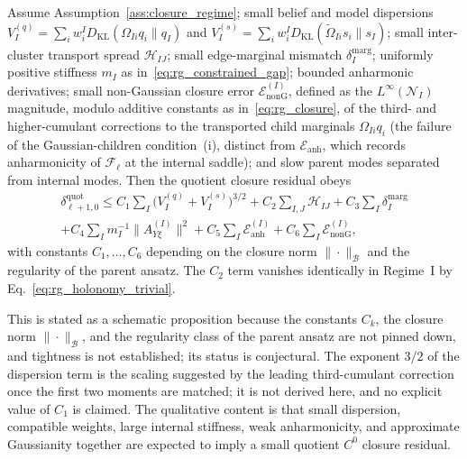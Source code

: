 \begin{proposition}
\label{thm:rg_residual}
Assume Assumption~\ref{ass:closure_regime}; small belief and model dispersions $V_I^{(q)} = \sum_i w_i^I D_{\mathrm{KL}}(\Omega_{Ii}q_i \| q_I)$ and $V_I^{(s)} = \sum_i w_i^I D_{\mathrm{KL}}(\widetilde{\Omega}_{Ii}s_i \| s_I)$; small inter-cluster transport spread $\mathcal{H}_{IJ}$; small edge-marginal mismatch $\delta_I^{\mathrm{marg}}$; uniformly positive stiffness $m_I$ as in~\eqref{eq:rg_constrained_gap}; bounded anharmonic derivatives; small non-Gaussian closure error $\mathcal{E}_{\mathrm{nonG}}^{(I)}$, defined as the $L^\infty(\mathcal{N}_I)$ magnitude, modulo additive constants as in~\eqref{eq:rg_closure}, of the third- and higher-cumulant corrections to the transported child marginals $\Omega_{Ii}q_i$ (the failure of the Gaussian-children condition~(i), distinct from $\mathcal{E}_{\mathrm{anh}}$, which records anharmonicity of $\mathcal{F}_\ell$ at the internal saddle); and slow parent modes separated from internal modes. Then the quotient closure residual obeys
\begin{multline}
\delta_{\ell+1,0}^{\mathrm{quot}} \le C_1\sum_I \big(V_I^{(q)} + V_I^{(s)}\big)^{3/2} + C_2\sum_{I,J}\mathcal{H}_{IJ} + C_3\sum_I \delta_I^{\mathrm{marg}} \\
 + C_4\sum_I m_I^{-1}\|A_{Y\xi}^{(I)}\|^2 + C_5\sum_I \mathcal{E}_{\mathrm{anh}}^{(I)} + C_6\sum_I \mathcal{E}_{\mathrm{nonG}}^{(I)},
\end{multline}
with constants $C_1, \ldots, C_6$ depending on the closure norm $\|\cdot\|_\mathcal{B}$ and the regularity of the parent ansatz. The $C_2$ term vanishes identically in Regime~I by Eq.~\eqref{eq:rg_holonomy_trivial}.
\end{proposition}

This is stated as a schematic proposition because the constants $C_k$, the closure norm $\|\cdot\|_\mathcal{B}$, and the regularity class of the parent ansatz are not pinned down, and tightness is not established; its status is conjectural. The exponent $3/2$ of the dispersion term is the scaling suggested by the leading third-cumulant correction once the first two moments are matched; it is not derived here, and no explicit value of $C_1$ is claimed. The qualitative content is that small dispersion, compatible weights, large internal stiffness, weak anharmonicity, and approximate Gaussianity together are expected to imply a small quotient $C^0$ closure residual.

